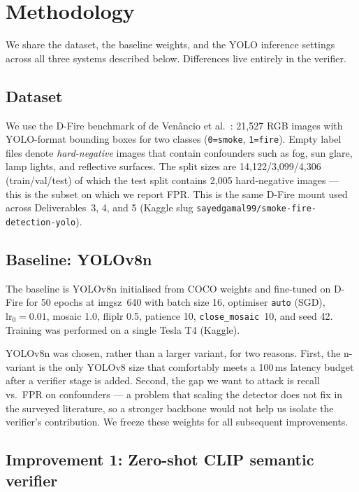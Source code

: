 \documentclass{article}
\begin{document}
\section{Methodology}
\label{sec:method}

We share the dataset, the baseline weights, and the YOLO inference settings
across all three systems described below. Differences live entirely in the
verifier.

\subsection{Dataset}
\label{sec:dataset}

We use the D-Fire benchmark of de Ven\^{a}ncio
et al.~\cite{dfire_dataset}: 21{,}527 RGB images with YOLO-format bounding
boxes for two classes (\texttt{0=smoke}, \texttt{1=fire}). Empty label files
denote \emph{hard-negative} images that contain confounders such as fog, sun
glare, lamp lights, and reflective surfaces. The split sizes are
14{,}122/3{,}099/4{,}306 (train/val/test) of which the test split contains
2{,}005 hard-negative images --- this is the subset on which we report FPR.
This is the same D-Fire mount used across Deliverables~3, 4, and 5 (Kaggle
slug \texttt{sayedgamal99/smoke-fire-detection-yolo}).

\subsection{Baseline: YOLOv8n}
\label{sec:baseline}

The baseline is YOLOv8n initialised from COCO weights and fine-tuned on
D-Fire for 50 epochs at imgsz~640 with batch size 16, optimiser \texttt{auto}
(SGD), $\text{lr}_0{=}0.01$, mosaic 1.0, fliplr 0.5, patience 10,
\texttt{close\_mosaic}~10, and seed 42. Training was performed on a single
Tesla T4 (Kaggle).

YOLOv8n was chosen, rather than a larger variant, for two reasons. First, the
n-variant is the only YOLOv8 size that comfortably meets a 100\,ms latency
budget after a verifier stage is added. Second, the gap we want to attack is
recall vs.\ FPR on confounders --- a problem that scaling the detector does not
fix in the surveyed literature, so a stronger backbone would not help us
isolate the verifier's contribution. We freeze these weights for all
subsequent improvements.

\subsection{Improvement 1: Zero-shot CLIP semantic verifier}
\label{sec:i1}
\end{document}
